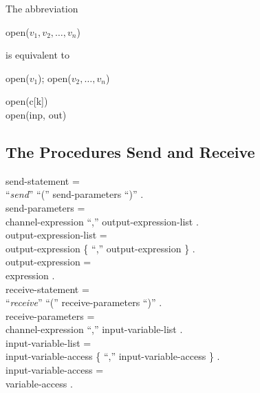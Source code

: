 The abbreviation  

\begin{center}
  open($v_1,v_2,\ldots,v_n$)
\end{center}

\noindent
is equivalent to

\begin{center}
  {\Begin} open($v_1$); open($v_2,\ldots,v_n$) {\End}
\end{center}

\examples

\begin{program}{6.3em}
  {\PA}open(c[k])    \\
  {\PA}open(inp, out)
\end{program}


\subsection{The Procedures Send and Receive}

\begin{grammar}
  {\GA}send-statement =                                           \\
    {\GB}``{\it send}'' ``('' send-parameters ``)'' .             \\
  {\GA}send-parameters =                                          \\
    {\GB}channel-expression ``,'' output-expression-list .        \\
  {\GA}output-expression-list =                                   \\
    {\GB}output-expression \{ ``,'' output-expression \} .        \\
  {\GA}output-expression =                                        \\
    {\GB}expression .                                             \\
  {\GA}receive-statement =                                        \\
    {\GB}``{\it receive}'' ``('' receive-parameters ``)'' .       \\
  {\GA}receive-parameters =                                       \\
    {\GB}channel-expression ``,'' input-variable-list .           \\
  {\GA}input-variable-list =                                      \\
    {\GB}input-variable-access \{ ``,'' input-variable-access \} .\\
  {\GA}input-variable-access =                                    \\
    {\GB}variable-access .                                        \\
\end{grammar}

